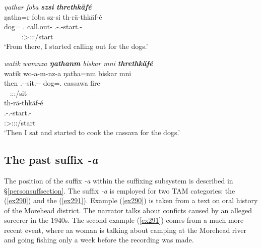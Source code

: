 \begin{exe}
	\ex \emph{ŋathar foba \textbf{szsi} \textbf{threthkäfé}}\\
	\glll ŋatha=r foba sz-si th-rä-thkäf-é\\
	dog={\Purp} \Dist.{\Abl} call.out-{\Nmlz} \Stnsg.\Bet-\Irr.\Ndu-start.\Rs-\Fsg\\
	~ ~ ~ {\footnotesize \Fsg:\Sbj>\Stpl:\Obj:\Irr:\Pfv/start}\\
	\trans `From there, I started calling out for the dogs.' 
	\label{ex288}
\end{exe}
\begin{exe}
	\ex \emph{watik wamnza \textbf{ŋathanm} biskar mni \textbf{threthkäfé}}\\
	\glll watik wo-a-m-nz-a ŋatha=nm biskar mni\\
	then \Fsg.\Alph-\Vc-sit.\Ext-\Ndu-\Pst{} dog=\Dat.{\Nsg} cassawa fire\\
	~ {\footnotesize \Fsg:\Sbj:\Pst:\Ipfv/sit} ~ ~ ~\\
	\sn
	\glll th-rä-thkäf-é\\
	\Stnsg.\Bet-\Irr.\Ndu-start.\Rs-\Fsg\\
	{\footnotesize \Fsg:\Sbj>\Stpl:\Obj:\Irr:\Pfv/start}\\
	\trans `Then I sat and started to cook the cassava for the dogs.' 
	\label{ex289}
\end{exe}

\subsection{The past suffix \emph{-a}} \label{pastsuffixa}

The position of the  suffix \emph{-a} within the suffixing subsystem is described in {\S}\ref{personsuffsection}. The  suffix \emph{-a} is employed for two TAM categories: the   (\ref{ex290}) and the   (\ref{ex291}). Example (\ref{ex290}) is taken from a text on oral history of the Morehead district. The narrator talks about conficts caused by an alleged sorcerer in the 1940s. The second example (\ref{ex291}) comes from a much more recent event, where aa woman is talking about camping at the Morehead river and going fishing only a week before the recording was made.

